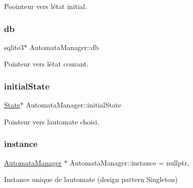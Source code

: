 Poointeur vers l\textquotesingle{}état initial. 

\mbox{\label{class_automata_manager_a81a9daff1e0a839798a30690324ae5bd}} 
\subsubsection{\texorpdfstring{db}{db}}
{\footnotesize\ttfamily sqlite3$\ast$ Automata\+Manager\+::db\hspace{0.3cm}{\ttfamily [private]}}



Pointeur vers l\textquotesingle{}état courant. 

\mbox{\label{class_automata_manager_aca1e971dc2f567a3bde4cdd1488aa64a}} 
\subsubsection{\texorpdfstring{initial\+State}{initialState}}
{\footnotesize\ttfamily \mbox{\hyperlink{class_state}{State}}$\ast$ Automata\+Manager\+::initial\+State\hspace{0.3cm}{\ttfamily [private]}}



Pointeur vers l\textquotesingle{}automate choisi. 

\mbox{\label{class_automata_manager_a2ea4e0a827dd9c14dac6fed45adccc19}} 
\subsubsection{\texorpdfstring{instance}{instance}}
{\footnotesize\ttfamily \mbox{\hyperlink{class_automata_manager}{Automata\+Manager}} $\ast$ Automata\+Manager\+::instance = nullptr\hspace{0.3cm}{\ttfamily [static]}, {\ttfamily [private]}}



Instance unique de l\textquotesingle{}automate (design pattern Singleton) 

